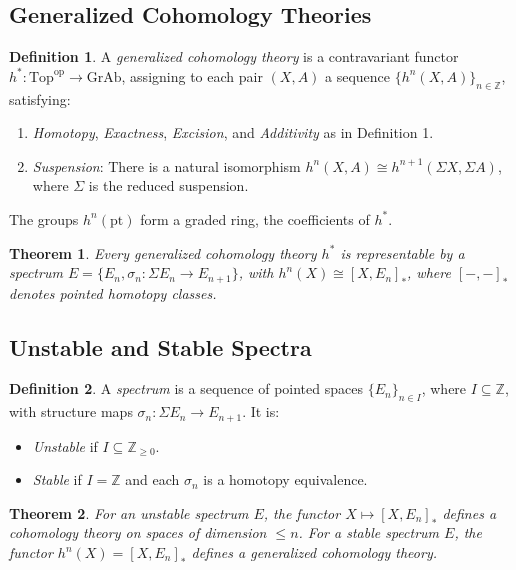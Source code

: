 \documentclass{article}
\theoremstyle{plain}
\newtheorem{theorem}{Theorem}
\theoremstyle{definition}
\newtheorem{definition}{Definition}
\newcommand{\Z}{\mathbb{Z}}
\newcommand{\pt}{\text{pt}}
\begin{document}
\subsection{Generalized Cohomology Theories}

\begin{definition}
A \emph{generalized cohomology theory} is a contravariant functor \( h^*: \text{Top}^{\text{op}} \to \text{GrAb} \), assigning to each pair \( (X, A) \) a sequence \( \{ h^n(X, A) \}_{n \in \Z} \), satisfying:
\begin{enumerate}
    \item \emph{Homotopy}, \emph{Exactness}, \emph{Excision}, and \emph{Additivity} as in Definition 1.
    \item \emph{Suspension}: There is a natural isomorphism \( h^n(X, A) \cong h^{n+1}(\Sigma X, \Sigma A) \), where \( \Sigma \) is the reduced suspension.
\end{enumerate}
The groups \( h^n(\pt) \) form a graded ring, the coefficients of \( h^* \).
\end{definition}

\begin{theorem}
Every generalized cohomology theory \( h^* \) is representable by a spectrum \( E = \{ E_n, \sigma_n: \Sigma E_n \to E_{n+1} \} \), with \( h^n(X) \cong [X, E_n]_* \), where \( [-, -]_* \) denotes pointed homotopy classes.
\end{theorem}

\subsection{Unstable and Stable Spectra}

\begin{definition}
A \emph{spectrum} is a sequence of pointed spaces \( \{ E_n \}_{n \in I} \), where \( I \subseteq \Z \), with structure maps \( \sigma_n: \Sigma E_n \to E_{n+1} \). It is:
\begin{itemize}
    \item \emph{Unstable} if \( I \subseteq \Z_{\geq 0} \).
    \item \emph{Stable} if \( I = \Z \) and each \( \sigma_n \) is a homotopy equivalence.
\end{itemize}
\end{definition}

\begin{theorem}
For an unstable spectrum \( E \), the functor \( X \mapsto [X, E_n]_* \) defines a cohomology theory on spaces of dimension \( \leq n \). For a stable spectrum \( E \), the functor \( h^n(X) = [X, E_n]_* \) defines a generalized cohomology theory.
\end{theorem}
\end{document}
